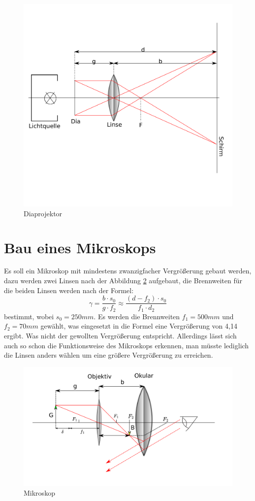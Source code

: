 \begin{figure}
    \centering
    \includegraphics[scale=0.8]{Geometrische_Optik/Protokoll/fig/Diaprojektor.png}
    \caption{Diaprojektor}
    \label{fig:Diaprojektor}
\end{figure}

\section{Bau eines Mikroskops}
Es soll ein Mikroskop mit mindestens zwanzigfacher Vergrößerung gebaut werden, dazu werden zwei Linsen nach der Abbildung \ref{fig:Mikroskop} aufgebaut, die Brennweiten für die beiden Linsen werden nach der Formel: $$ \gamma = \frac{b \cdot s_0}{g \cdot f_2 } \approx \frac{(d - f_2) \cdot s_0}{f_1 \cdot d_2}$$ bestimmt, wobei $s_0 = 250mm$. Es werden die Brennweiten $f_1 = 500mm$ und $f_2 = 70mm$ gewählt, was eingesetzt in die Formel eine Vergrößerung von 4,14 ergibt. Was nicht der gewollten Vergrößerung entspricht. Allerdings lässt sich auch so schon die Funktionsweise des Mikroskops erkennen, man müsste lediglich die Linsen anders wählen um eine größere Vergrößerung zu erreichen.

\begin{figure}
    \centering
    \includegraphics[scale=0.8]{Geometrische_Optik/Protokoll/fig/Mikroskop.png}
    \caption{Mikroskop}
    \label{fig:Mikroskop}
\end{figure}